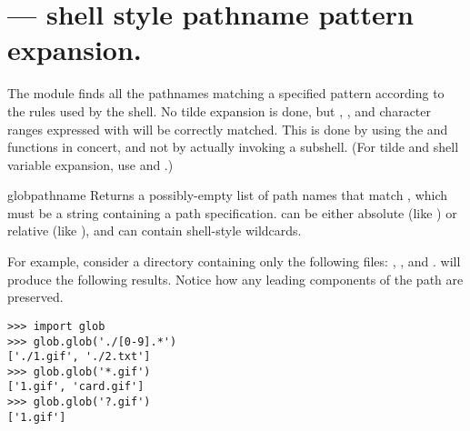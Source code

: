 \section{ ---
         \UNIX{} shell style pathname pattern expansion.}



The  module finds all the pathnames matching a specified
pattern according to the rules used by the \UNIX{} shell.  No tilde
expansion is done, but \code{*}, , and character ranges
expressed with \code{[]} will be correctly matched.  This is done by
using the  and 
functions in concert, and not by actually invoking a subshell.  (For
tilde and shell variable expansion, use 
and .)

\begin{funcdesc}{glob}{pathname}
Returns a possibly-empty list of path names that match ,
which must be a string containing a path specification.
 can be either absolute (like
) or relative (like
), and can contain shell-style wildcards.
\end{funcdesc}

For example, consider a directory containing only the following files:
, , and .  
will produce the following results.  Notice how any leading components
of the path are preserved.

\begin{verbatim}
>>> import glob
>>> glob.glob('./[0-9].*')
['./1.gif', './2.txt']
>>> glob.glob('*.gif')
['1.gif', 'card.gif']
>>> glob.glob('?.gif')
['1.gif']
\end{verbatim}
